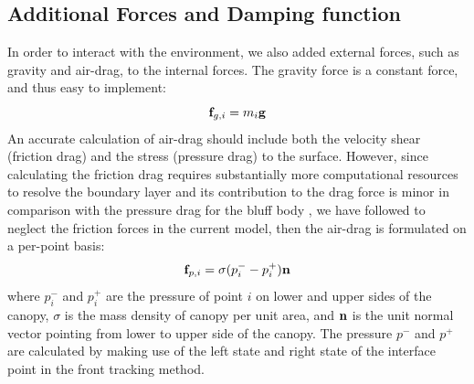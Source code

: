 \subsection{Additional Forces and Damping function}
In order to interact with the environment, we also added external forces, such as gravity 
and air-drag, to the internal forces. The gravity force is a constant force, and thus easy to implement:
\begin{equation}
\mathbf{f}_{g,i} = m_i \mathbf{g}
\end{equation}
An accurate calculation of air-drag should include both the velocity shear (friction drag) and the stress (pressure drag) to the surface. However, since calculating the friction drag requires substantially more computational resources to resolve the boundary layer and its contribution to the drag force is minor in comparison with the pressure drag for the bluff body \cite{}, we have followed \cite{KalroTezduyar2000} to neglect the friction forces in the  current model, then the air-drag is formulated on a per-point basis:
\begin{equation}
\mathbf{f}_{p,i} = \sigma(p_i^- - p_i^+)\mathbf{n} \label{eq:drag}
\end{equation}
where $p_i^-$ and $p_i^+$ are the pressure of point $i$ on lower and upper sides of the canopy, $\sigma$ is the mass density of canopy per unit area, and $\mathbf{n}$ is the unit normal vector pointing from lower to upper side of the canopy. The pressure $p^-$ and $p^+$ are calculated by making use of the left state and right state of the interface point in the front tracking method.


